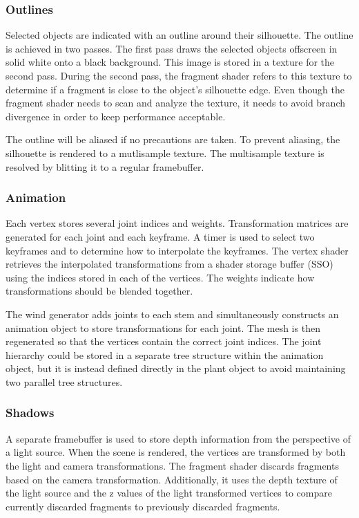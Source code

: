 \documentclass[10pt]{article}
\begin{document}
\subsubsection{Outlines}
Selected objects are indicated with an outline around their silhouette. The outline is achieved in two passes. The first pass draws the selected objects offscreen in solid white onto a black background. This image is stored in a texture for the second pass. During the second pass, the fragment shader refers to this texture to determine if a fragment is close to the object's silhouette edge. Even though the fragment shader needs to scan and analyze the texture, it needs to avoid branch divergence in order to keep performance acceptable.

The outline will be aliased if no precautions are taken. To prevent aliasing, the silhouette is rendered to a mutlisample texture. The multisample texture is resolved by blitting it to a regular framebuffer.

\subsubsection{Animation}

Each vertex stores several joint indices and weights. Transformation matrices are generated for each joint and each keyframe. A timer is used to select two keyframes and to determine how to interpolate the keyframes. The vertex shader retrieves the interpolated transformations from a shader storage buffer (SSO) using the indices stored in each of the vertices. The weights indicate how transformations should be blended together.

The wind generator adds joints to each stem and simultaneously constructs an animation object to store transformations for each joint. The mesh is then regenerated so that the vertices contain the correct joint indices. The joint hierarchy could be stored in a separate tree structure within the animation object, but it is instead defined directly in the plant object to avoid maintaining two parallel tree structures.

\subsubsection{Shadows}

A separate framebuffer is used to store depth information from the perspective of a light source. When the scene is rendered, the vertices are transformed by both the light and camera transformations. The fragment shader discards fragments based on the camera transformation. Additionally, it uses the depth texture of the light source and the z values of the light transformed vertices to compare currently discarded fragments to previously discarded fragments.
\end{document}
